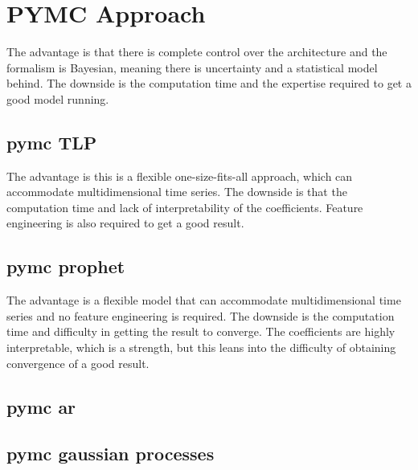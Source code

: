 \chapter{PYMC Approach}

The advantage is that there is complete control over the architecture and the formalism is Bayesian, meaning there is uncertainty and a statistical model behind. The downside is the computation time and the expertise required to get a good model running.

\section{pymc TLP}
The advantage is this is a flexible one-size-fits-all approach, which can accommodate multidimensional time series. The downside is that the computation time and lack of interpretability of the coefficients. Feature engineering is also required to get a good result.


\section{pymc prophet}
The advantage is a flexible model that can accommodate multidimensional time series and no feature engineering is required. The downside is the computation time and difficulty in getting the result to converge. The coefficients are highly interpretable, which is a strength, but this leans into the difficulty of obtaining convergence of a good result. 


\section{pymc ar}

\section{pymc gaussian processes}